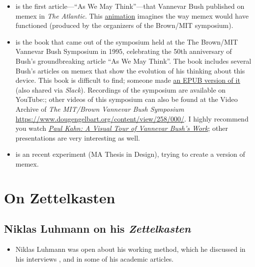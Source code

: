 \documentclass[
]{book}
\providecommand{\tightlist}{%
  \setlength{\itemsep}{0pt}\setlength{\parskip}{0pt}}
\begin{document}
\begin{itemize}
\tightlist
\item
  \citep{BushWe1945} is the first article---``As We May Think''---that Vannevar Bush published on memex in \emph{The Atlantic}. This \href{https://www.youtube.com/watch?v=c539cK58ees}{animation} imagines the way memex would have functioned (produced by the organizers of the Brown/MIT symposium).
\item
  \citep{NyceMemex1991} is the book that came out of the symposium held at the The Brown/MIT Vannevar Bush Symposium in 1995, celebrating the 50th anniversary of Bush's groundbreaking article ``As We May Think''. The book includes several Bush's articles on memex that show the evolution of his thinking about this device. This book is difficult to find; someone made \href{https://monoskop.org/File:Nyce_James_Kahn_Paul_eds_From_Memex_to_Hypertext_Vannevar_Bush_and_the_Minds_Machine.epub}{an EPUB version of it} (also shared via \emph{Slack}). Recordings of the symposium are available on YouTube:; other videos of this symposium can also be found at the Video Archive of \emph{The MIT/Brown Vannevar Bush Symposium} \url{https://www.dougengelbart.org/content/view/258/000/}. I highly recommend you watch \href{https://www.youtube.com/watch?v=BwwvMUzasU0\&t=1853s}{\emph{Paul Kahn: A Visual Tour of Vannevar Bush's Work}}; other presentations are very interesting as well.
\item
  \citep{ParkMemex2014} is an recent experiment (MA Thesis in Design), trying to create a version of memex.
\end{itemize}

\hypertarget{on-zettelkasten}{%
\section*{On Zettelkasten}\label{on-zettelkasten}}

\hypertarget{niklas-luhmann-on-his-zettelkasten}{%
\subsection*{\texorpdfstring{Niklas Luhmann on his \emph{Zettelkasten}}{Niklas Luhmann on his Zettelkasten}}\label{niklas-luhmann-on-his-zettelkasten}}

\begin{itemize}
\tightlist
\item
  Niklas Luhmann was open about his working method, which he discussed in his interviews \citep{LuhmannArchimedes1987}, and in some of his academic articles\citep{LuhmannKommunikation1982}.
\end{itemize}
\end{document}

